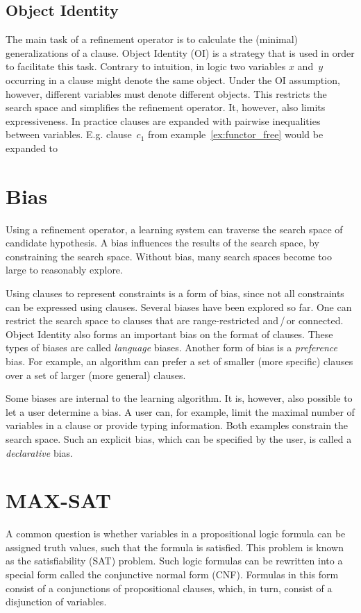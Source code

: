 \subsection{Object Identity}
The main task of a refinement operator is to calculate the (minimal) generalizations of a clause. Object Identity (OI) is a strategy that is used in order to facilitate this task. Contrary to intuition, in logic two variables $x$ and~$y$ occurring in a clause might denote the same object. Under the OI assumption, however, different variables must denote different objects. This restricts the search space and simplifies the refinement operator. It, however, also limits expressiveness. In practice clauses are expanded with pairwise inequalities between variables. E.g. clause~$c_1$ from example~\ref{ex:functor_free} would be expanded to 

\section{Bias}
Using a refinement operator, a learning system can traverse the search space of candidate hypothesis. A bias influences the results of the search space, by constraining the search space. Without bias, many search spaces become too large to reasonably explore.

Using clauses to represent constraints is a form of bias, since not all constraints can be expressed using clauses. Several biases have been explored so far. One can restrict the search space to clauses that are range-restricted and\,/\,or connected. Object Identity also forms an important bias on the format of clauses. These types of biases are called \textit{language} biases. Another form of bias is a \textit{preference} bias. For example, an algorithm can prefer a set of smaller (more specific) clauses over a set of larger (more general) clauses.

Some biases are internal to the learning algorithm. It is, however, also possible to let a user determine a bias. A user can, for example, limit the maximal number of variables in a clause or provide typing information. Both examples constrain the search space. Such an explicit bias, which can be specified by the user, is called a \textit{declarative} bias.

\section{MAX-SAT}
\label{sec:max_sat}
A common question is whether variables in a propositional logic formula can be assigned truth values, such that the formula is satisfied.
This problem is known as the satisfiability (SAT) problem.
Such logic formulas can be rewritten into a special form called the conjunctive normal form (CNF).
Formulas in this form consist of a conjunctions of propositional clauses, which, in turn, consist of a disjunction of variables.

